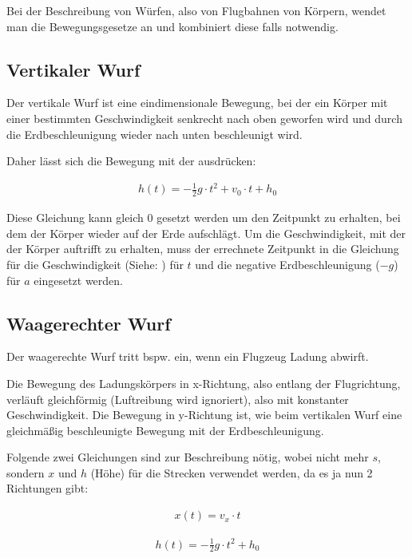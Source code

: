 Bei der Beschreibung von Würfen, also von Flugbahnen von Körpern, wendet man die Bewegungsgesetze an und kombiniert diese falls notwendig.


\subsection{Vertikaler Wurf}

Der vertikale Wurf ist eine eindimensionale Bewegung, bei der ein Körper mit einer bestimmten Geschwindigkeit senkrecht nach oben geworfen wird und durch die Erdbeschleunigung wieder nach unten beschleunigt wird.

Daher lässt sich die Bewegung mit der  ausdrücken:

\begin{align} \label{eq:wurfvertikal}
	h(t) = -\frac{1}{2}g \cdot t^2 + v_0 \cdot t + h_0
\end{align}

\noindent Diese Gleichung kann gleich $0$ gesetzt werden um den Zeitpunkt zu erhalten, bei dem der Körper wieder auf der Erde aufschlägt. Um die Geschwindigkeit, mit der der Körper auftrifft zu erhalten, muss der errechnete Zeitpunkt in die Gleichung für die Geschwindigkeit (Siehe: ) für $t$ und die negative Erdbeschleunigung ($-g$) für $a$ eingesetzt werden.


\subsection{Waagerechter Wurf}

Der waagerechte Wurf tritt bspw. ein, wenn ein Flugzeug Ladung abwirft.

Die Bewegung des Ladungskörpers in x-Richtung, also entlang der Flugrichtung, verläuft gleichförmig (Luftreibung wird ignoriert), also mit konstanter Geschwindigkeit. Die Bewegung in y-Richtung ist, wie beim vertikalen Wurf eine gleichmäßig beschleunigte Bewegung mit der Erdbeschleunigung.

Folgende zwei Gleichungen sind zur Beschreibung nötig, wobei nicht mehr $s$, sondern $x$ und $h$ (Höhe) für die Strecken verwendet werden, da es ja nun 2 Richtungen gibt:

\begin{align}
	x(t) = v_x \cdot t
\end{align}

\begin{align}
	h(t) = -\frac{1}{2}g \cdot t^2 + h_0
\end{align}

